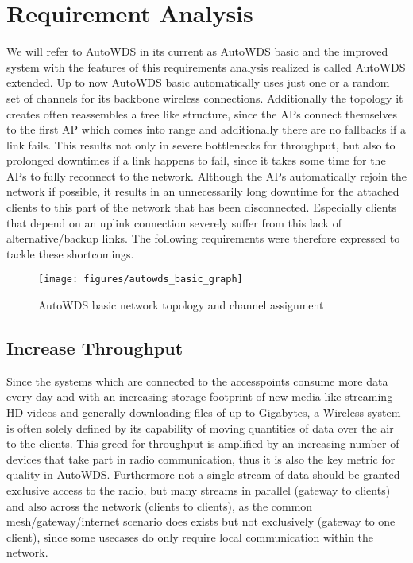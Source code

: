 \chapter{Requirement Analysis}
  \label{reqana}
  We will refer to AutoWDS in its current as AutoWDS basic and the improved system with the features of this requirements analysis realized 
  is called AutoWDS extended.
  Up to now AutoWDS basic automatically uses just one or a random set of channels for its backbone wireless connections. 
  Additionally the topology it creates often reassembles a tree like structure, since the APs connect themselves 
  to the first AP which comes into range and additionally there are no fallbacks if a link fails. 
  This results not only in severe bottlenecks for throughput, but also to prolonged downtimes if a link happens to fail, since
  it takes some time for the APs to fully reconnect to the network. Although the APs automatically rejoin the network if possible, it
  results in an unnecessarily long downtime for the attached clients to this part of the network that has been disconnected.
  Especially clients that depend on an uplink connection severely suffer from this lack of alternative/backup links.
  The following requirements were therefore expressed to tackle these shortcomings.
  
  \begin{figure}[h!]
    \centering
    \texttt{[image: figures/autowds\_basic\_graph]}
    \caption{AutoWDS basic network topology and channel assignment}
    \label{fig:autowds_basic_graph}
  \end{figure}

  \section{Increase Throughput}
  \label{reqincreasethroughput}
  Since the systems which are connected to the accesspoints consume more data every day and with an increasing storage-footprint of new media like streaming HD videos
  and generally downloading files of up to Gigabytes, a Wireless system is often solely defined by its capability of moving quantities of data over the air to the clients.
  This greed for throughput is amplified by an increasing number of devices that take part in radio communication, 
  thus it is also the key metric for quality in AutoWDS. Furthermore not a single stream of data should be granted exclusive access to the radio, but
  many streams in parallel (gateway to clients) and also across the network (clients to clients), 
  as the common mesh/gateway/internet scenario does exists but not exclusively (gateway to one client),
  since some usecases do only require local communication within the network.
  
